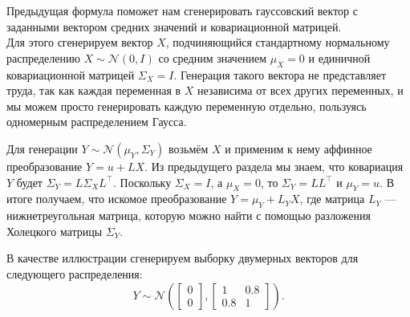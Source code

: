 \documentclass[11pt,a4paper]{article}
\begin{document}
Предыдущая формула поможет нам сгенерировать гауссовский вектор с
заданными вектором средних значений и ковариационной матрицей.\\
Для этого сгенерируем вектор \(X\), подчиняющийся стандартному
нормальному распределению \(X \sim \mathcal{N}(0, I)\) со средним
значением \(\mu_{X} = 0\) и единичной ковариационной матрицей
\(\Sigma_{X} = I\). Генерация такого вектора не представляет труда, так
как каждая переменная в \(X\) независима от всех других переменных, и мы
можем просто генерировать каждую переменную отдельно, пользуясь
одномерным распределением Гаусса.

Для генерации \(Y \sim \mathcal{N}(\mu_{Y}, \Sigma_{Y})\) возьмём \(X\)
и применим к нему аффинное преобразование \(Y = u + LX\). Из предыдущего
раздела мы знаем, что ковариация \(Y\) будет
\(\Sigma_{Y} = L\Sigma_{X}L^\top\). Поскольку \(\Sigma_{X}=I\), а
\(\mu_{X} = 0\), то \(\Sigma_{Y} = L L^\top\) и \(\mu_{Y} = u\). В итоге
получаем, что искомое преобразование \(Y = \mu_{Y} + L_{Y}X\), где
матрица \(L_{Y}\) --- нижнетреугольная матрица, которую можно найти с
помощью разложения Холецкого матрицы \(\Sigma_{Y}\).

    В качестве иллюстрации сгенерируем выборку двумерных векторов для
следующего распределения: \[
Y
\sim
\mathcal{N}\left(
\begin{bmatrix}
    0 \\
    0
\end{bmatrix},
\begin{bmatrix}
    1 & 0.8 \\
    0.8 & 1
\end{bmatrix}\right).
\]
\end{document}

